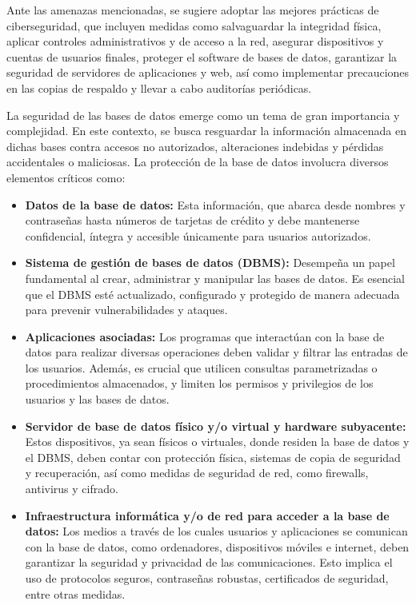 \documentclass[11pt]{report}
\begin{document}
Ante las amenazas mencionadas, se sugiere adoptar las mejores prácticas de
ciberseguridad, que incluyen medidas como salvaguardar la integridad física, aplicar
controles administrativos y de acceso a la red, asegurar dispositivos y cuentas de usuarios
finales, proteger el software de bases de datos, garantizar la seguridad de servidores de
aplicaciones y web, así como implementar precauciones en las copias de respaldo y llevar a
cabo auditorías periódicas.

La seguridad de las bases de datos emerge como un tema de gran importancia y
complejidad. En este contexto, se busca resguardar la información almacenada en dichas
bases contra accesos no autorizados, alteraciones indebidas y pérdidas accidentales o
maliciosas. La protección de la base de datos involucra diversos elementos críticos como:

\begin{itemize}
\item \textbf{Datos de la base de datos:} Esta información, que abarca desde nombres y
contraseñas hasta números de tarjetas de crédito y debe mantenerse confidencial,
íntegra y accesible únicamente para usuarios autorizados.
\item \textbf{Sistema de gestión de bases de datos (DBMS):} Desempeña un papel fundamental
al crear, administrar y manipular las bases de datos. Es esencial que el DBMS esté
actualizado, configurado y protegido de manera adecuada para prevenir
vulnerabilidades y ataques.
\item \textbf{Aplicaciones asociadas:} Los programas que interactúan con la base de datos para
realizar diversas operaciones deben validar y filtrar las entradas de los usuarios.
Además, es crucial que utilicen consultas parametrizadas o procedimientos
almacenados, y limiten los permisos y privilegios de los usuarios y las bases de
datos.
\item \textbf{Servidor de base de datos físico y/o virtual y hardware subyacente:} Estos
dispositivos, ya sean físicos o virtuales, donde residen la base de datos y el DBMS,
deben contar con protección física, sistemas de copia de seguridad y recuperación,
así como medidas de seguridad de red, como firewalls, antivirus y cifrado.
\item \textbf{Infraestructura informática y/o de red para acceder a la base de datos:} Los medios a
través de los cuales usuarios y aplicaciones se comunican con la base de datos,
como ordenadores, dispositivos móviles e internet, deben garantizar la seguridad y
privacidad de las comunicaciones. Esto implica el uso de protocolos seguros,
contraseñas robustas, certificados de seguridad, entre otras medidas.
\end{itemize}
\end{document}
